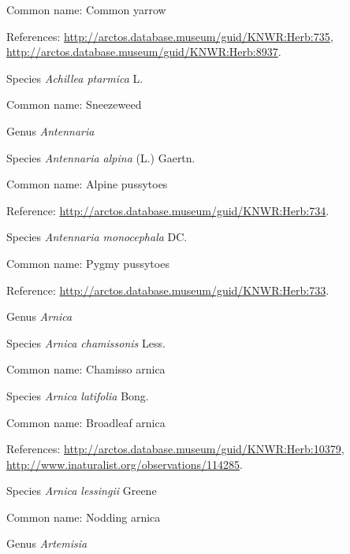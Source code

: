 \documentclass[9pt, article]{memoir}
\begin{document}
\begin{multicols}{2}
Common name: Common yarrow

References: 
\url{http://arctos.database.museum/guid/KNWR:Herb:735}, 
\url{http://arctos.database.museum/guid/KNWR:Herb:8937}.

\vspace{6pt}\noindent\hspace{36pt}Species \textit{Achillea ptarmica} L.


Common name: Sneezeweed

\vspace{6pt}\noindent\hspace{30pt}Genus \textit{Antennaria}


\vspace{6pt}\noindent\hspace{36pt}Species \textit{Antennaria alpina} (L.) Gaertn.


Common name: Alpine pussytoes

Reference: 
\url{http://arctos.database.museum/guid/KNWR:Herb:734}.

\vspace{6pt}\noindent\hspace{36pt}Species \textit{Antennaria monocephala} DC.


Common name: Pygmy pussytoes

Reference: 
\url{http://arctos.database.museum/guid/KNWR:Herb:733}.

\vspace{6pt}\noindent\hspace{30pt}Genus \textit{Arnica}


\vspace{6pt}\noindent\hspace{36pt}Species \textit{Arnica chamissonis} Less.


Common name: Chamisso arnica

\vspace{6pt}\noindent\hspace{36pt}Species \textit{Arnica latifolia} Bong.


Common name: Broadleaf arnica

References: 
\url{http://arctos.database.museum/guid/KNWR:Herb:10379}, 
\url{http://www.inaturalist.org/observations/114285}.

\vspace{6pt}\noindent\hspace{36pt}Species \textit{Arnica lessingii} Greene


Common name: Nodding arnica

\vspace{6pt}\noindent\hspace{30pt}Genus \textit{Artemisia}



\end{multicols}
\end{document}
